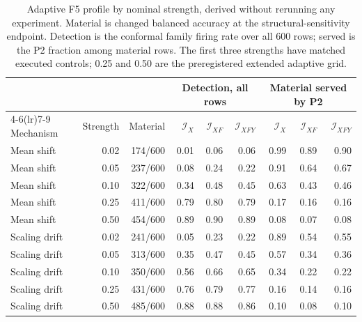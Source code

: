 \begin{table}[!t]
\caption{Adaptive F5 profile by nominal strength, derived without rerunning any experiment. Material is changed balanced accuracy at the structural-sensitivity endpoint. Detection is the conformal family firing rate over all 600 rows; served is the P2 fraction among material rows. The first three strengths have matched executed controls; 0.25 and 0.50 are the preregistered extended adaptive grid.}
\label{tab:s-adaptive-strength-profile}
\centering
\scriptsize
\setlength{\tabcolsep}{3pt}
\begin{tabular}{@{}lrrrrrrrr@{}}
\toprule
 & & & \multicolumn{3}{c}{Detection, all rows} & \multicolumn{3}{c}{Material served by P2} \\
\cmidrule(lr){4-6}\cmidrule(lr){7-9}
Mechanism & Strength & Material & $\mathcal I_X$ & $\mathcal I_{XF}$ & $\mathcal I_{XFY}$ & $\mathcal I_X$ & $\mathcal I_{XF}$ & $\mathcal I_{XFY}$ \\
\midrule
Mean shift & 0.02 & 174/600 & 0.01 & 0.06 & 0.06 & 0.99 & 0.89 & 0.90 \\
Mean shift & 0.05 & 237/600 & 0.08 & 0.24 & 0.22 & 0.91 & 0.64 & 0.67 \\
Mean shift & 0.10 & 322/600 & 0.34 & 0.48 & 0.45 & 0.63 & 0.43 & 0.46 \\
Mean shift & 0.25 & 411/600 & 0.79 & 0.80 & 0.79 & 0.17 & 0.16 & 0.16 \\
Mean shift & 0.50 & 454/600 & 0.89 & 0.90 & 0.89 & 0.08 & 0.07 & 0.08 \\
Scaling drift & 0.02 & 241/600 & 0.05 & 0.23 & 0.22 & 0.89 & 0.54 & 0.55 \\
Scaling drift & 0.05 & 313/600 & 0.35 & 0.47 & 0.45 & 0.57 & 0.34 & 0.36 \\
Scaling drift & 0.10 & 350/600 & 0.56 & 0.66 & 0.65 & 0.34 & 0.22 & 0.22 \\
Scaling drift & 0.25 & 431/600 & 0.76 & 0.79 & 0.77 & 0.16 & 0.14 & 0.16 \\
Scaling drift & 0.50 & 485/600 & 0.88 & 0.88 & 0.86 & 0.10 & 0.08 & 0.10 \\
\bottomrule
\end{tabular}
\end{table}
